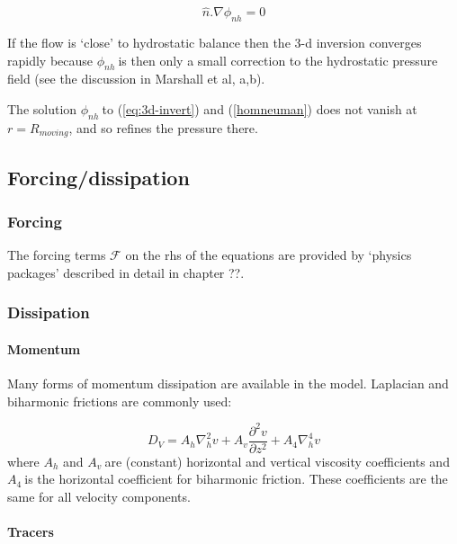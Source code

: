 \documentclass[12pt]{book}
\begin{document}
\begin{equation}
\widehat{n}.\nabla \phi _{nh}=0  \label{eq:hom-neumann-nh}
\end{equation}

If the flow is `close' to hydrostatic balance then the 3-d inversion
converges rapidly because $\phi _{nh}\ $is then only a small correction to
the hydrostatic pressure field (see the discussion in Marshall et al, a,b).

The solution $\phi _{nh}\ $to (\ref{eq:3d-invert}) and (\ref{homneuman})
does not vanish at $r=R_{moving}$, and so refines the pressure there.

\subsection{Forcing/dissipation}

\subsubsection{Forcing}

The forcing terms $\mathcal{F}$ on the rhs of the equations are provided by
`physics packages' described in detail in chapter ??.

\subsubsection{Dissipation}

\paragraph{Momentum}

Many forms of momentum dissipation are available in the model. Laplacian and
biharmonic frictions are commonly used:

\begin{equation}
D_{V}=A_{h}\nabla _{h}^{2}v+A_{v}\frac{\partial ^{2}v}{\partial z^{2}}
+A_{4}\nabla _{h}^{4}v  \label{eq:dissipation}
\end{equation}
where $A_{h}$ and $A_{v}\ $are (constant) horizontal and vertical viscosity
coefficients and $A_{4}\ $is the horizontal coefficient for biharmonic
friction. These coefficients are the same for all velocity components.

\paragraph{Tracers}
\end{document}
